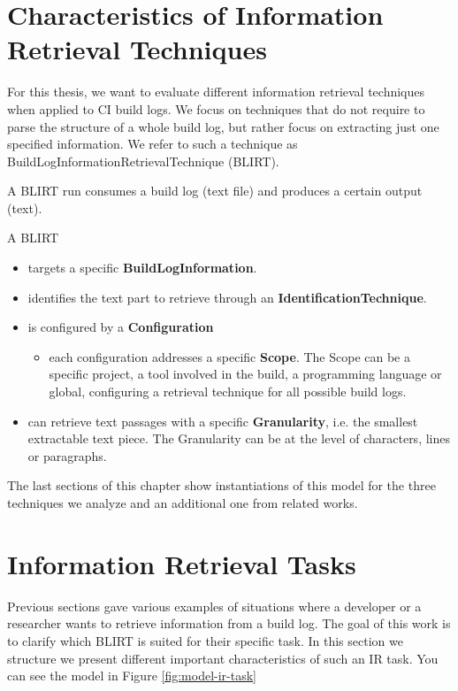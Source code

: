 \documentclass[\myrootdir/main.tex]{subfiles}
\begin{document}
\section{Characteristics of Information Retrieval Techniques}
\label{sec:blirt}
For this thesis, we want to evaluate different information retrieval techniques when applied to CI build logs.
We focus on techniques that do not require to parse the structure of a whole build log, but rather focus on extracting just one specified information.
We refer to such a technique as BuildLogInformationRetrievalTechnique (BLIRT).

A BLIRT run consumes a build log (text file) and produces a certain output (text).

A BLIRT
\begin{itemize}
	\item targets a specific \textbf{BuildLogInformation}.
	\item identifies the text part to retrieve through an \textbf{IdentificationTechnique}.
	\item is configured by a \textbf{Configuration}
	      \begin{itemize}
		      \item each configuration addresses a specific \textbf{Scope}.
		            The Scope can be a specific project, a tool involved in the build, a programming language or global, configuring a retrieval technique for all possible build logs.
	      \end{itemize}
	\item can retrieve text passages with a specific \textbf{Granularity}, i.e. the smallest extractable text piece.
	      The Granularity can be at the level of characters, lines or paragraphs.
\end{itemize}

The last sections of this chapter show instantiations of this model for the three techniques we analyze and an additional one from related works.

\section{Information Retrieval Tasks}
\label{sec:blir-tasks}
Previous sections gave various examples of situations where a developer or a researcher wants to retrieve information from a build log.
The goal of this work is to clarify which BLIRT is suited for their specific task.
In this section we structure we present different important characteristics of such an IR task.
You can see the model in Figure \ref{fig:model-ir-task}
\end{document}
